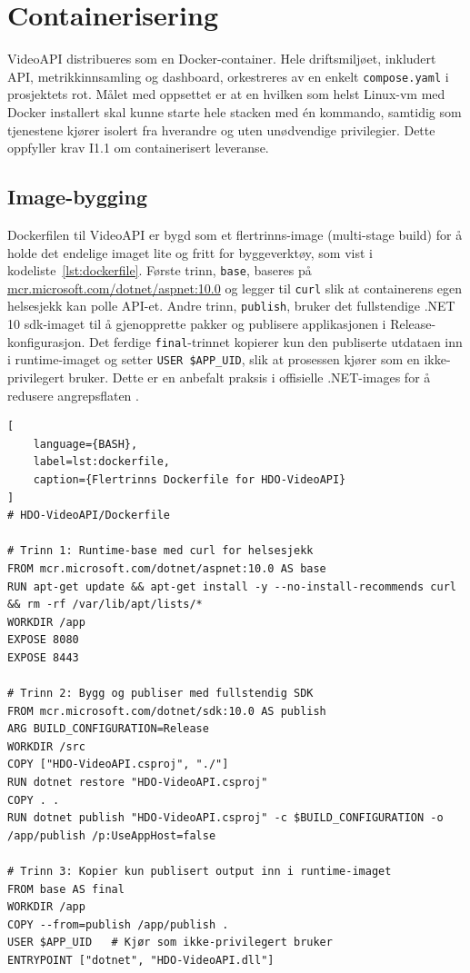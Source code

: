 \section{Containerisering}
\label{sec:docker}

VideoAPI distribueres som en Docker-container. Hele driftsmiljøet, inkludert API, metrikkinnsamling og dashboard, orkestreres av en enkelt \texttt{compose.yaml} i prosjektets rot. Målet med oppsettet er at en hvilken som helst Linux-\gls{vm} med Docker installert skal kunne starte hele stacken med én kommando, samtidig som tjenestene kjører isolert fra hverandre og uten unødvendige privilegier. Dette oppfyller krav I1.1 \cite{hdo_kravspec} om containerisert leveranse.

\subsection{Image-bygging}
\label{subsec:docker-image}

Dockerfilen til VideoAPI er bygd som et flertrinns-image (multi-stage build) for å holde det endelige imaget lite og fritt for byggeverktøy, som vist i kodeliste~\ref{lst:dockerfile}. Første trinn, \texttt{base}, baseres på \url{mcr.microsoft.com/dotnet/aspnet:10.0} og legger til \texttt{curl} slik at containerens egen helsesjekk kan polle API-et. Andre trinn, \texttt{publish}, bruker det fullstendige .NET 10 \gls{sdk}-imaget til å gjenopprette pakker og publisere applikasjonen i Release-konfigurasjon. Det ferdige \texttt{final}-trinnet kopierer kun den publiserte utdataen inn i runtime-imaget og setter \texttt{USER \$APP\_UID}, slik at prosessen kjører som en ikke-privilegert bruker. Dette er en anbefalt praksis i offisielle .NET-images for å redusere angrepsflaten \cite{aspnet_rootless}.

\begin{lstlisting}[
    language={BASH},
    label=lst:dockerfile,
    caption={Flertrinns Dockerfile for HDO-VideoAPI}
]
# HDO-VideoAPI/Dockerfile

# Trinn 1: Runtime-base med curl for helsesjekk
FROM mcr.microsoft.com/dotnet/aspnet:10.0 AS base
RUN apt-get update && apt-get install -y --no-install-recommends curl && rm -rf /var/lib/apt/lists/*
WORKDIR /app
EXPOSE 8080
EXPOSE 8443

# Trinn 2: Bygg og publiser med fullstendig SDK
FROM mcr.microsoft.com/dotnet/sdk:10.0 AS publish
ARG BUILD_CONFIGURATION=Release
WORKDIR /src
COPY ["HDO-VideoAPI.csproj", "./"]
RUN dotnet restore "HDO-VideoAPI.csproj"
COPY . .
RUN dotnet publish "HDO-VideoAPI.csproj" -c $BUILD_CONFIGURATION -o /app/publish /p:UseAppHost=false

# Trinn 3: Kopier kun publisert output inn i runtime-imaget
FROM base AS final
WORKDIR /app
COPY --from=publish /app/publish .
USER $APP_UID   # Kjør som ikke-privilegert bruker
ENTRYPOINT ["dotnet", "HDO-VideoAPI.dll"]
\end{lstlisting}

